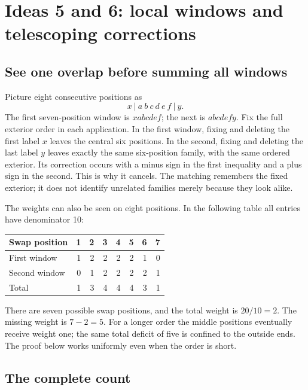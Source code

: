 \section{Ideas 5 and 6: local windows and telescoping corrections}\label{sec:windows}

\subsection{See one overlap before summing all windows}
Picture eight consecutive positions as
\[
 x\ \big|\ a\ b\ c\ d\ e\ f\ \big|\ y.
\]
The first seven-position window is \(xabcdef\); the next is
\(abcdefy\). Fix the full exterior order in each application.
In the first window, fixing and deleting the first label \(x\)
leaves the central six positions. In the second, fixing and deleting
the last label \(y\) leaves exactly the same six-position family,
with the same ordered exterior. Its correction occurs with a minus
sign in the first inequality and a plus sign in the second.
This is why it cancels. The matching remembers the fixed exterior;
it does not identify unrelated families merely because they look alike.

The weights can also be seen on eight positions. In the following
table all entries have denominator 10:
\begin{center}\small
\begin{tabular}{@{}lrrrrrrr@{}}\toprule
Swap position&1&2&3&4&5&6&7\\\midrule
First window&1&2&2&2&2&1&0\\
Second window&0&1&2&2&2&2&1\\\midrule
Total&1&3&4&4&4&3&1\\\bottomrule
\end{tabular}
\end{center}
There are seven possible swap positions, and the total weight is
\(20/10=2\). The missing weight is \(7-2=5\).
For a longer order the middle positions eventually receive weight
one; the same total deficit of five is confined to the outside ends.
The proof below works uniformly even when the order is short.

\subsection{The complete count}

